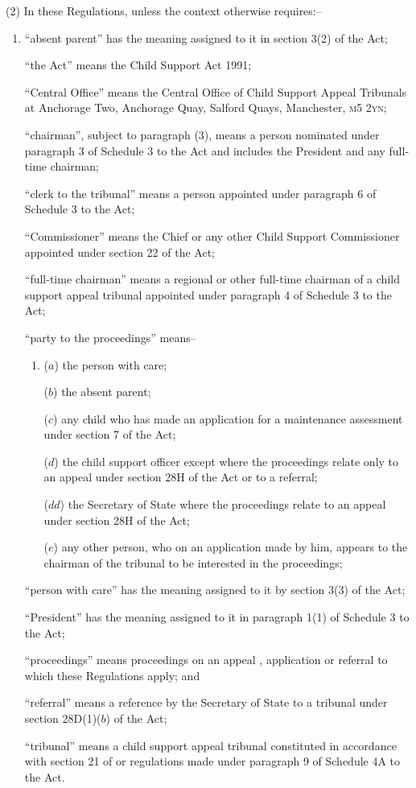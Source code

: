 \documentclass[a4paper]{article}
\begin{document}
(2) In these Regulations, unless the context otherwise requires:–
\begin{enumerate}\item[]
“absent parent” has the meaning assigned to it in section 3(2) of the Act;

“the Act” means the Child Support Act 1991;

“Central Office” means the Central Office of Child Support Appeal Tribunals at Anchorage Two, Anchorage Quay, Salford Quays, Manchester, \textsc{m5 2yn};

“chairman”, subject to paragraph (3), means a person nominated under paragraph 3 of Schedule 3 to the Act and includes the President and any full-time chairman;

“clerk to the tribunal” means a person appointed under paragraph 6 of Schedule 3 to the Act;

“Commissioner” means the Chief or any other Child Support Commissioner appointed under section 22 of the Act;

“full-time chairman” means a regional or other full-time chairman of a child support appeal tribunal appointed under paragraph 4 of Schedule 3 to the Act;

“party to the proceedings” means–
\begin{enumerate}\item[]
($a$) the person with care;

($b$) the absent parent;

($c$) any child who has made an application for a maintenance assessment under section 7 of the Act;

($d$) the child support officer
except where the proceedings relate only to an appeal under section 28H
of the Act or to a referral;  %

($dd$) the Secretary of State where the proceedings relate to an appeal under
section 28H of the Act;

($e$) any other person, who on an application made by him, appears to the chairman of the tribunal to be interested in the proceedings;
\end{enumerate}

“person with care” has the meaning assigned to it by section 3(3) of the Act;

“President” has the meaning assigned to it in paragraph 1(1) of Schedule 3 to the Act;

“proceedings” means proceedings on an appeal%
, application or referral  %
to which these Regulations apply; and

“referral” means a reference by the Secretary of State to a tribunal under
section 28D(1)($b$) of the Act;

“tribunal” means a child support appeal tribunal constituted in accordance with section 21 of 
or regulations made under paragraph 9 of Schedule 4A
to  %
the Act.
\end{enumerate}
\end{document}
